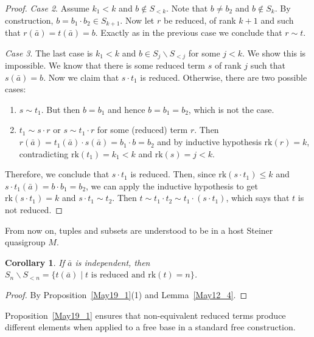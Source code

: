 \documentclass[a4paper, 11pt]{article}
\newcommand{\rk}{\mathrm{rk}}
\theoremstyle{note}
\newtheorem{cor}[thm]{Corollary}
\begin{document}
\begin{proof}
		\emph{Case 2}. Assume $k_1 <k$ and $b\not \in S_{<k}$.  Note that $b\neq b_2$ and $b\not \in S_k$. By construction, $b= b_1\cdot b_2 \in S_{k+1}$.  Now let $r$ be reduced, of rank $k+1$ and such that $r(\bar{a})= t(\bar{a})=b$. Exactly as in the previous case we conclude that $r\sim t$.
		
		\emph{Case 3}. The last case is $k_1 < k$ and  $b\in S_j\smallsetminus S_{<j}$  for some $j<k$.  We show this is impossible.   We know that there is some reduced term $s$ of rank $j$ such that $s(\bar{a}) = b$. Now we claim that $s\cdot t_1$ is reduced. Otherwise, there are two possible cases:
		\begin{enumerate}
			\item[(i)] $s\sim t_1$.  But then $b= b_1$ and hence $b=b_1 = b_2$, which is not the case.
			\item[(ii)]  $t_1\sim s\cdot r$ or $s\sim t_1\cdot r$  for some (reduced)  term $r$.  Then $r(\bar{a})= t_1(\bar{a})\cdot s(\bar{a})= b_1\cdot b= b_2$  and by inductive hypothesis $\rk(r)=k$, contradicting $\rk(t_1)=k_1<k$ and $\rk(s)= j<k$.
		\end{enumerate}
		Therefore, we conclude that $s\cdot t_1$ is reduced. Then, since $\rk(s\cdot t_1)\leq k$ and $s\cdot  t_1 (\bar{a}) = b\cdot b_1 = b_2$, we can apply the inductive hypothesis to get $\rk(s\cdot t_1)= k$  and  $s\cdot t_1\sim t_2$. Then $t\sim t_1\cdot t_2\sim t_1\cdot (s\cdot t_1)$, which says that $t$ is not reduced.
	\end{proof}

From now on, tuples and subsets are understood to be in a host Steiner quasigroup $M$.

	\begin{cor}\label{May19_2}  If $\bar{a}$ is independent, then $S_n\smallsetminus S_{<n} =\{t(\bar{a})\mid t \mbox{ is reduced and } \rk(t) = n\}$.
	\end{cor}
	\begin{proof} By Proposition~\ref{May19_1}(1) and Lemma~\ref{May12_4}.
	\end{proof}

Proposition~\ref{May19_1} ensures that non-equivalent reduced terms produce different elements when applied to a free base in a standard free construction.
	
\end{document}
